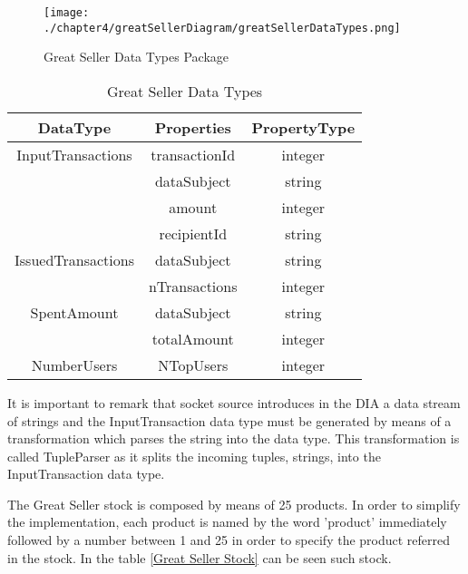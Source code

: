 \begin{figure}
\centering
{\texttt{[image: ./chapter4/greatSellerDiagram/greatSellerDataTypes.png]}}
\caption{Great Seller Data Types Package}
\label{fig:Great Seller Data Types Package}
\end{figure}

\begin{table}[h!]
\centering
	\begin{tabular}{||c|c|c||} 
	\hline\hline
	DataType & Properties & PropertyType \\ [1ex] 
	\hline\hline
	InputTransactions & transactionId & integer  \\
	& dataSubject & string  \\
	& amount & integer  \\
	& recipientId & string  \\
	\hline
	IssuedTransactions & dataSubject & string  \\
	& nTransactions & integer \\
	\hline
	SpentAmount & dataSubject & string  \\
	& totalAmount & integer \\
	\hline
	NumberUsers & NTopUsers & integer  \\
	\hline\hline
	\end{tabular}
\caption{Great Seller Data Types}
\label{Great Seller Data Types}
\end{table}

It is important to remark that socket source introduces in the DIA a data stream of strings and the InputTransaction data type must be generated by means of a transformation which parses the string into the data type. This transformation is called TupleParser as it splits the incoming tuples, strings, into the InputTransaction data type.

The Great Seller stock is composed by means of 25 products. In order to simplify the implementation, each product is named by the word 'product' immediately followed by a number between 1 and 25 in order to specify the product referred in the stock. In the table \ref{Great Seller Stock} can be seen such stock.

